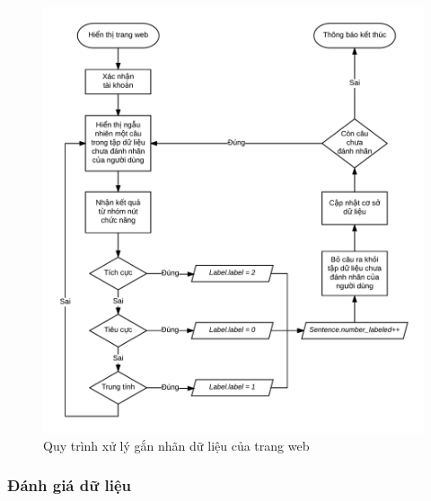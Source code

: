 \begin{figure}[H]
\centering
\includegraphics[scale=0.27]{../hinh/UpdateDatabase.png}
\caption{Quy trình xử lý gắn nhãn dữ liệu của trang web}
\label{fig:updatedb}
\end{figure}

\subsubsection*{Đánh giá dữ liệu}

